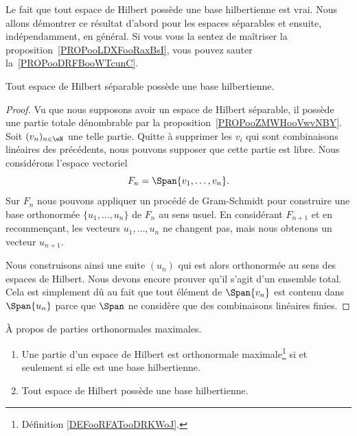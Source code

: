 Le fait que tout espace de Hilbert possède une base hilbertienne est vrai. Nous allons démontrer ce résultat d'abord pour les espaces séparables et ensuite, indépendamment, en général. Si vous vous la sentez de maîtriser la proposition~\ref{PROPooLDXFooRaxBsI}, vous pouvez sauter la~\ref{PROPooDRFBooWTcunC}.
\begin{proposition}     \label{PROPooDRFBooWTcunC}
	Tout espace de Hilbert séparable possède une base hilbertienne.
\end{proposition}

\begin{proof}
	Vu que nous supposons avoir un espace de Hilbert séparable, il possède une partie totale dénombrable par la proposition~\ref{PROPooZMWHooVwvNBY}. Soit  \( (v_n)_{n\in \eN}\) une telle partie. Quitte à supprimer les \( v_i\) qui sont combinaisons linéaires des précédents, nous pouvons supposer que cette partie est libre. Nous considérons l'espace vectoriel
	\begin{equation}
		F_n=\Span\{ v_1,\ldots, v_n \}.
	\end{equation}
	Sur \( F_n\) nous pouvons appliquer un procédé de Gram-Schmidt pour construire une base orthonormée \( \{ u_1,\ldots, u_n \}\) de \( F_n\) au sens usuel. En considérant \( F_{n+1}\) et en recommençant, les vecteurs \( u_1,\ldots, u_n\) ne changent pas, mais nous obtenons un vecteur \( u_{n+1}\).

	Nous construisons ainsi une suite \( (u_n)\) qui est alors orthonormée au sens des espaces de Hilbert. Nous devons encore prouver qu'il s'agit d'un ensemble total. Cela est simplement dû au fait que tout élément de \( \Span\{ v_n \}\) est contenu dans \( \Span\{ u_n \}\) parce que \( \Span\) ne considère que des combinaisons linéaires finies.
\end{proof}

\begin{proposition}      \label{PROPooLDXFooRaxBsI}
	À propos de parties orthonormales maximales.
	\begin{enumerate}
		\item           \label{ITEMooVUFXooDrVwum}
		      Une partie d'un espace de Hilbert est orthonormale maximale\footnote{Définition \ref{DEFooRFATooDRKWoJ}.} si et seulement si elle est une base hilbertienne.
		\item       \label{ITEMooZFENooQnSlrv}
		      Tout espace de Hilbert possède une base hilbertienne.
	\end{enumerate}
\end{proposition}

